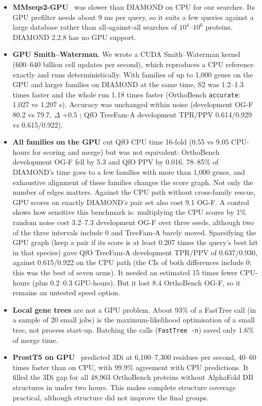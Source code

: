 \begin{itemize}
\item \textbf{MMseqs2-GPU}~\cite{kallenborn2025mmseqs2gpu} was slower than DIAMOND on CPU for our searches. Its GPU prefilter needs about 9 ms per query, so it suits a few queries against a large database rather than all-against-all searches of $10^4$--$10^6$ proteins. DIAMOND 2.2.8 has no GPU support.
\item \textbf{GPU Smith--Waterman.} We wrote a CUDA Smith--Waterman kernel (600--640 billion cell updates per second), which reproduces a CPU reference exactly and runs deterministically. With families of up to 1,000 genes on the GPU and larger families on DIAMOND at the same time, S2 was 1.2--1.3 times faster and the whole run 1.18 times faster (OrthoBench \texttt{accurate}: 1,027 vs 1,207 s). Accuracy was unchanged within noise (development OG-F 80.2 vs 79.7, $\Delta$ $+0.5$ ; QfO TreeFam-A development TPR/PPV 0.614/0.929 vs 0.615/0.922).
\item \textbf{All families on the GPU} cut QfO CPU time 16-fold (0.55 vs 9.05 CPU-hours for scoring and merge) but was not equivalent: OrthoBench development OG-F fell by 5.3  and QfO PPV by 0.016. 78--85\% of DIAMOND's time goes to a few families with more than 1,000 genes, and exhaustive alignment of these families changes the score graph. Not only the number of edges matters. Against the CPU path without cross-family rescue, GPU scores on exactly DIAMOND's pair set also cost 9.1 OG-F. A control shows how sensitive this benchmark is: multiplying the CPU scores by 1\% random noise cost 3.2--7.3 development OG-F over three seeds, although two of the three intervals include 0 and TreeFam-A barely moved. Sparsifying the GPU graph (keep a pair if its score is at least 0.207 times the query's best hit in that species) gave QfO TreeFam-A development TPR/PPV of 0.637/0.930, against 0.615/0.922 on the CPU path (the CIs of both differences include 0; this was the best of seven arms). It needed an estimated 15 times fewer CPU-hours (plus 0.2--0.3 GPU-hours). But it lost 8.4 OrthoBench OG-F, so it remains an untested speed option.
\item \textbf{Local gene trees} are not a GPU problem. About 93\% of a FastTree call (in a sample of 20 small jobs) is the maximum-likelihood optimisation of a small tree, not process start-up. Batching the calls (\texttt{FastTree -n}) saved only 1.6\% of merge time.
\item \textbf{ProstT5 on GPU}~\cite{heinzinger2024prostt5} predicted 3Di at 6,100--7,300 residues per second, 40--60 times faster than on CPU, with 99.9\% agreement with CPU predictions. It filled the 3Di gap for all 48,903 OrthoBench proteins without AlphaFold DB structures in under two hours. This makes complete structure coverage practical, although structure did not improve the final groups.

\end{itemize}
